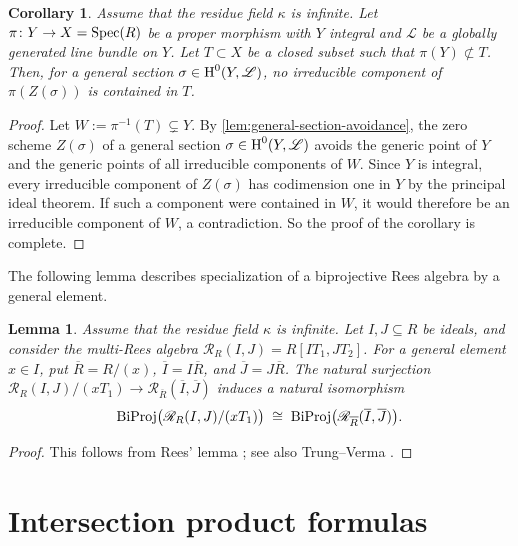 \documentclass[a4paper, 11pt]{amsart}
\newcommand{\Rees}{\mathscr{R}}
\newcommand{\LL}{\mathscr{L}}
\newcommand{\HH}{\normalfont\text{H}}
\newcommand{\Spec}{\normalfont\text{Spec}}
\newcommand{\biProj}{{\normalfont\text{BiProj}}}
\newtheorem{corollary}[corollary]{Corollary}
\newtheorem{lemma}[lemma]{Lemma}
\theoremstyle{definition}
\begin{document}
	\begin{corollary}
		\label{lem_avoid_projection}
		Assume that the residue field $\kappa$ is infinite.
		Let $\pi\colon Y\to X=\Spec(R)$ be a proper morphism with $Y$ integral and $\mathscr{L}$ be a globally generated line bundle on $Y$.
		Let $T\subset X$ be a closed subset such that $\pi(Y)\not\subset T$.
		Then, for a general section $\sigma\in\HH^0(Y,\LL)$, no irreducible
		component of $\pi\left(Z(\sigma)\right)$ is contained in $T$.
	\end{corollary}
	\begin{proof}
		Let $W:=\pi^{-1}(T)\subsetneq Y$.
		By \autoref{lem:general-section-avoidance}, the zero scheme $Z(\sigma)$
		of a general section $\sigma \in \HH^0(Y, \LL)$ avoids the generic point of $Y$ and the generic points of all irreducible components of $W$.
		Since $Y$ is integral, every irreducible component of $Z(\sigma)$ has codimension one in $Y$ by the principal ideal theorem.
		If such a component were contained in $W$, it would therefore be an irreducible component of $W$, a contradiction.
		So the proof of the corollary is complete.
	\end{proof}
	
	The following lemma describes specialization of a biprojective Rees algebra
	by a general element.
	
	\begin{lemma}
		\label{lem:rees-superficial-specialization}
		Assume that the residue field $\kappa$ is infinite.
		Let $I,J\subseteq R$ be ideals, and consider the multi-Rees algebra $\Rees_R(I,J)=R[IT_1,JT_2]$.
		For a general element $x\in I$, put $\overline R=R/(x)$,
		$\overline I=I\overline R$, and $\overline J=J\overline R$.
		The natural surjection
		$\Rees_R(I,J)/(xT_1)\longrightarrow\Rees_{\overline R}(\overline I,\overline J)$
		induces a natural isomorphism
		$$
		\biProj\bigl(\Rees_R(I,J)/(xT_1)\bigr)
		\;\cong\;
		\biProj\bigl(\Rees_{\overline R}(\overline I,\overline J)\bigr).
		$$
	\end{lemma}
	\begin{proof}
		This follows from Rees' lemma \cite[Lemma~1.2]{Rees84}; see also
		Trung--Verma \cite{TV}.
	\end{proof}
	
	
	
	\section{Intersection product formulas}
	\label{sec:intersection-formulas}
	
\end{document}
